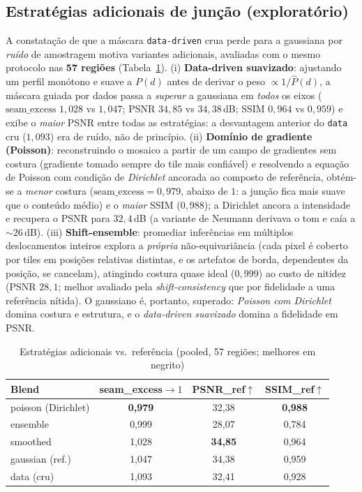 \documentclass[conference]{IEEEtran}
\begin{document}
\subsection{Estratégias adicionais de junção (exploratório)}
A constatação de que a máscara \texttt{data-driven} crua perde para a gaussiana por
\emph{ruído} de amostragem motiva variantes adicionais, avaliadas com o mesmo protocolo
nas \textbf{57 regiões} (Tabela~\ref{tab:blendextra}). (i) \textbf{Data-driven suavizado}:
ajustando um perfil monótono e suave a $P(d)$ antes de derivar o peso $\propto 1/\hat{P}(d)$,
a máscara guiada por dados passa a \emph{superar} a gaussiana em \emph{todos} os eixos
($\mathrm{seam\_excess}$ $1{,}028$ vs $1{,}047$; PSNR $34{,}85$ vs $34{,}38$\,dB; SSIM
$0{,}964$ vs $0{,}959$) e exibe o \emph{maior} PSNR entre todas as estratégias: a
desvantagem anterior do \texttt{data} cru ($1{,}093$) era de ruído, não de princípio.
(ii) \textbf{Domínio de gradiente (Poisson)}: reconstruindo o mosaico a partir de um campo
de gradientes sem costura (gradiente tomado sempre do tile mais confiável) e resolvendo a
equação de Poisson com condição de \emph{Dirichlet} ancorada ao composto de referência,
obtém-se a \emph{menor} costura ($\mathrm{seam\_excess}=0{,}979$, abaixo de $1$: a junção
fica mais suave que o conteúdo médio) e o \emph{maior} SSIM ($0{,}988$); a Dirichlet ancora
a intensidade e recupera o PSNR para $32{,}4$\,dB (a variante de Neumann derivava o tom e
caía a $\sim$$26$\,dB). (iii) \textbf{Shift-ensemble}: promediar inferências em múltiplos
deslocamentos inteiros explora a \emph{própria} não-equivariância (cada pixel é coberto
por tiles em posições relativas distintas, e os artefatos de borda, dependentes da posição,
se cancelam), atingindo costura quase ideal ($0{,}999$) ao custo de nitidez (PSNR
$28{,}1$; melhor avaliado pela \textit{shift-consistency} que por fidelidade a uma
referência nítida). O gaussiano é, portanto, superado: \emph{Poisson com Dirichlet} domina
costura e estrutura, e o \emph{data-driven suavizado} domina a fidelidade em PSNR.

\begin{table}[htbp]
\caption{Estratégias adicionais vs.\ referência (pooled, 57 regiões; melhores em negrito)}
\label{tab:blendextra}
\begin{center}
\begin{tabular}{lccc}
\toprule
\textbf{Blend} & \textbf{seam\_excess}$\to 1$ & \textbf{PSNR\_ref}$\uparrow$ & \textbf{SSIM\_ref}$\uparrow$ \\
\midrule
poisson (Dirichlet) & \textbf{0,979} & 32,38 & \textbf{0,988} \\
ensemble            & 0,999 & 28,07 & 0,784 \\
smoothed            & 1,028 & \textbf{34,85} & 0,964 \\
gaussian (ref.)     & 1,047 & 34,38 & 0,959 \\
data (cru)          & 1,093 & 32,41 & 0,928 \\
\bottomrule
\end{tabular}
\end{center}
\end{table}
\end{document}
